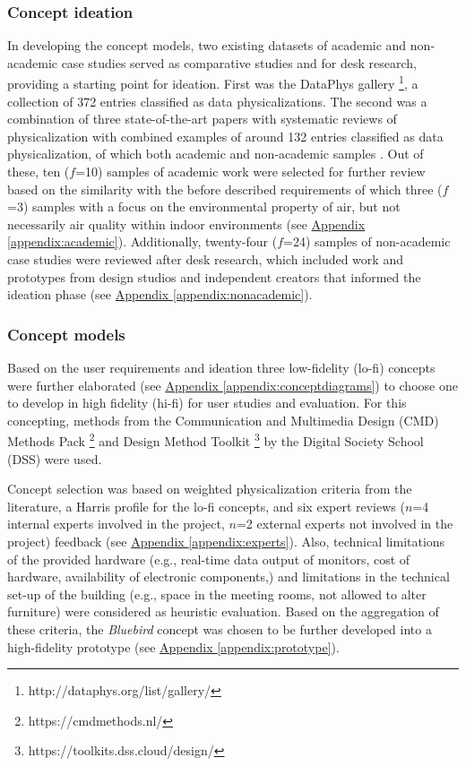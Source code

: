 \subsubsection{Concept ideation}
In developing the concept models, two existing datasets of academic and non-academic case studies served as comparative studies and for desk research, providing a starting point for ideation. First was the DataPhys gallery \footnote{http://dataphys.org/list/gallery/}, a collection of 372 entries classified as data physicalizations. The second was a combination of three state-of-the-art papers with systematic reviews of physicalization with combined examples of around 132 entries classified as data physicalization, of which both academic and non-academic samples \cite{sauve_physecology_2022, anhalt_university_germany_design_2022, ranasinghe_encoding_2023}. Out of these, ten ($f$=10) samples of academic work were selected for further review based on the similarity with the before described requirements of which three ($f$=3) samples with a focus on the environmental property of air, but not necessarily air quality within indoor environments (see \hyperref[appendix:academic]{Appendix \ref*{appendix:academic}}). Additionally, twenty-four ($f$=24) samples of non-academic case studies were reviewed after desk research, which included work and prototypes from design studios and independent creators that informed the ideation phase (see \hyperref[appendix:nonacademic]{Appendix \ref*{appendix:nonacademic}}).

\subsubsection{Concept models}

Based on the user requirements and ideation three low-fidelity (lo-fi) concepts were further elaborated (see \hyperref[appendix:conceptdiagrams]{Appendix \ref*{appendix:conceptdiagrams}}) to choose one to develop in high fidelity (hi-fi) for user studies and evaluation. For this concepting, methods from the Communication and Multimedia Design (CMD) Methods Pack \footnote{https://cmdmethods.nl/} and Design Method Toolkit \footnote{https://toolkits.dss.cloud/design/} by the Digital Society School (DSS) were used.

Concept selection was based on weighted physicalization criteria from the literature, a Harris profile for the lo-fi concepts, and six expert reviews ($n$=4 internal experts involved in the project, $n$=2 external experts not involved in the project) feedback (see \hyperref[appendix:experts]{Appendix \ref*{appendix:experts}}). Also, technical limitations of the provided hardware (e.g., real-time data output of monitors, cost of hardware, availability of electronic components,) and limitations in the technical set-up of the building (e.g., space in the meeting rooms, not allowed to alter furniture) were considered as heuristic evaluation. Based on the aggregation of these criteria, the \textit{Bluebird} concept was chosen to be further developed into a high-fidelity prototype (see \hyperref[appendix:prototype]{Appendix \ref*{appendix:prototype}}).


